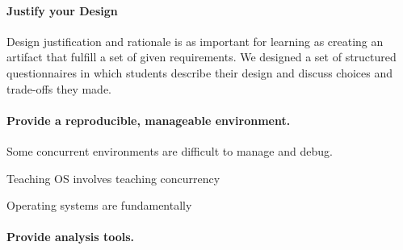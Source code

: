 \paragraph{Justify your Design}
Design justification and rationale is as important for learning as creating an artifact 
that fulfill a set of given requirements.  We designed a set of structured questionnaires 
in which students describe their design and discuss choices and trade-offs they made.

\paragraph{Provide a reproducible, manageable environment.}
Some concurrent environments are difficult to manage and debug.  

Teaching OS involves teaching concurrency

Operating systems are fundamentally

\paragraph{Provide analysis tools.}
